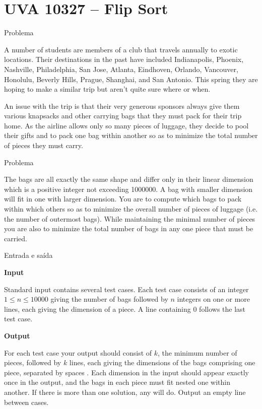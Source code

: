 \section{UVA 10327 -- Flip Sort}

\begin{frame}[fragile]{Problema}

A number of students are members of a club that travels annually to exotic locations. Their 
destinations in the past have included Indianapolis, Phoenix, Nashville, Philadelphia, San Jose, 
Atlanta, Eindhoven, Orlando, Vancouver, Honolulu, Beverly Hills, Prague, Shanghai, and 
San Antonio. This spring they are hoping to make a similar trip but aren’t quite sure where or when.

An issue with the trip is that their very generous sponsors always give them various knapsacks and 
other carrying bags that they must pack for their trip home.  As the airline allows only so many 
pieces of luggage, they decide to pool their gifts and to pack one bag within another so as to 
minimize the total number of pieces they must carry.

\end{frame}

\begin{frame}[fragile]{Problema}

The bags are all exactly the same shape and differ only in their linear dimension which is a 
positive integer not exceeding 1000000. A bag with smaller dimension will fit in one with larger 
dimension. You are to compute which bags to pack within which others so as to minimize the overall 
number of pieces of luggage (i.e. the number of outermost bags). While maintaining the minimal 
number of pieces you are also to minimize the total number of bags in any one piece that must be 
carried.

\end{frame}

\begin{frame}[fragile]{Entrada e saída}

\textbf{Input}

Standard input contains several test cases. Each test case consists of an integer 
$1\leq n\leq 10000$ giving the number of bags followed by $n$ integers on one or more lines, 
each giving the dimension of a piece.  A line containing $0$ follows the last test case.

\vspace{0.1in}

\textbf{Output}

For each test case your output should consist of $k$, the minimum number of pieces, followed by 
$k$ lines, each giving the dimensions of the bags comprising one piece, separated by spaces
. Each dimension in the input should appear exactly once in the output, and the bags in each piece 
must fit nested one
within another. If there is more than one solution, any will do. Output an empty line between cases.

\end{frame}

